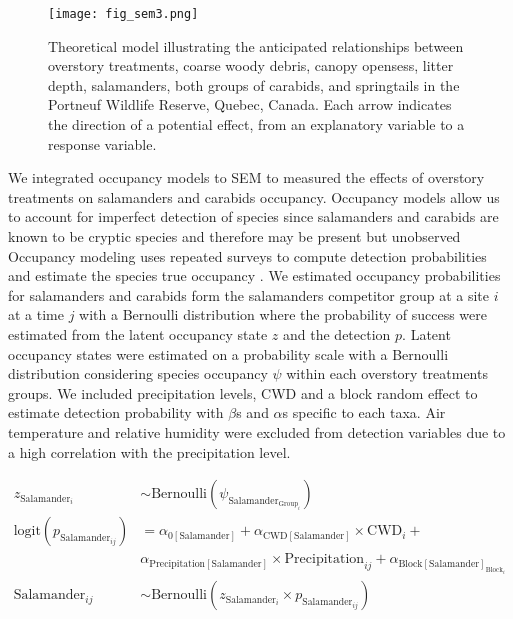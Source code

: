\begin{figure}[ht!]
	\centering
	\texttt{[image: fig\_sem3.png]}
	\caption[Theoretical model illustrating the anticipated relationships between overstory treatments, environmental variables and species groups.]
  {Theoretical model illustrating the anticipated relationships between overstory treatments, coarse woody debris, canopy opensess, litter depth,
   salamanders, both groups of carabids, and springtails in the Portneuf Wildlife Reserve, Quebec, Canada. Each arrow indicates the direction of a potential effect, from an explanatory variable to a response variable.}
	\label{fig:SEM}
	\end{figure}  

\vspace{0.5cm}
  
We integrated occupancy models to SEM to measured the effects of overstory treatments on salamanders and carabids occupancy. 
Occupancy models allow us to account for imperfect detection of species since salamanders and carabids are known to be cryptic species and therefore may be present but unobserved \citep{baileyEstimatingSiteOccupancy2004,spiersEstimatingSpeciesMisclassification2022}
Occupancy modeling uses repeated surveys to compute detection probabilities and estimate the species true occupancy \citep{mackenzieEstimatingSiteOccupancy2002,mazerolleMakingGreatLeaps2007}.
We estimated occupancy probabilities for salamanders and carabids form the salamanders competitor group at a site $i$ at a time $j$ with a Bernoulli distribution where the probability of success were estimated from the latent occupancy state $z$ and the detection $p$.
Latent occupancy states were estimated on a probability scale with a Bernoulli distribution considering species occupancy $\psi$ within each overstory treatments groups.
We included precipitation levels, CWD and a block random effect to estimate detection probability with $\beta$s and $\alpha$s specific to each taxa.
Air temperature and relative humidity were excluded from detection variables due to a high correlation with the precipitation level.

\begin{align}
z_{\text{Salamander}_i} &\sim 
\text{Bernoulli}(\psi_{\text{Salamander}_{\text{Group}_i}}) \nonumber \\
\text{logit}(p_{\text{Salamander}_{ij}}) &= 
\alpha_{0[\text{Salamander}]} + \alpha_{\text{CWD}[\text{Salamander}]} \times \text{CWD}_i + \\
&\alpha_{\text{Precipitation}[\text{Salamander}]} \times \text{Precipitation}_{ij} + \alpha_{\text{Block}[\text{Salamander}]_{\text{Block}_i}} \nonumber \\
\text{Salamander}_{ij} &\sim 
\text{Bernoulli}(z_{\text{Salamander}_i} \times p_{\text{Salamander}_{ij}}) \nonumber
\end{align} 

